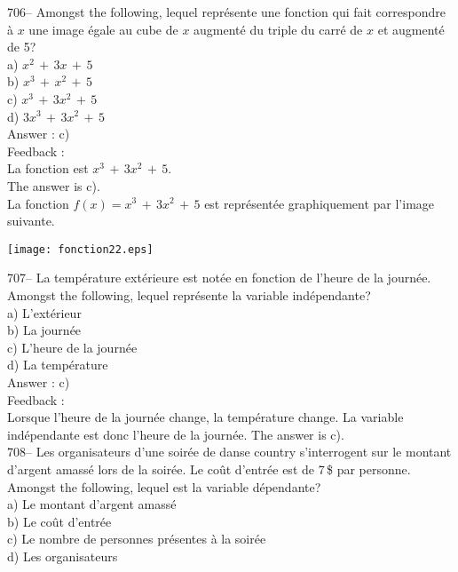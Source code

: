 ﻿\documentclass[letterpaper, 12pt]{article}
\begin{document}
706-- Amongst the following, lequel repr\'esente une fonction qui
fait correspondre \`a $x$ une image \'egale au cube de $x$ augment\'e du
triple du carr\'e de $x$ et augment\'e de 5?\\
a) $x^{2}\,+\,3x \,+\,5$\\
b) $x^{3}\,+\,x^{2}\,+\,5$\\
c) $x^{3}\,+\,3x^{2}\,+\,5$\\
d) $3x^{3}\,+\,3x^{2}\,+\,5$\\

Answer : c)\\

Feedback : \\
La fonction est $x^{3}\,+\,3x^{2}\,+\,5$.\\
The answer is c).\\
La fonction $f(x)=x^{3}\,+\,3x^{2}\,+\,5$ est repr\'esent\'ee graphiquement
par l'image suivante.  \\
    \begin{center}
    \texttt{[image: fonction22.eps]}
    \end{center}


707-- La temp\'erature ext\'erieure est not\'ee en fonction de l'heure de la
journ\'ee.  Amongst the following, lequel repr\'esente la variable
ind\'ependante?\\
a) L'ext\'erieur\\
b) La journ\'ee\\
c) L'heure de la journ\'ee\\
d) La temp\'erature\\

Answer :  c)\\

Feedback : \\
Lorsque l'heure de la journ\'ee change, la temp\'erature change.  La
variable ind\'ependante est donc l'heure de la journ\'ee.  The answer is
c).\\

708-- Les organisateurs d'une soir\'ee de danse country s'interrogent sur le
montant d'argent amass\'e lors de la soir\'ee.  Le co\^ut d'entr\'ee est de
7\,\$ par personne.  Amongst the following, lequel est la variable
d\'ependante?\\
a) Le montant d'argent amass\'e\\
b) Le co\^ut d'entr\'ee\\
c) Le nombre de personnes pr\'esentes \`a la soir\'ee\\
d) Les organisateurs\\
\end{document}

